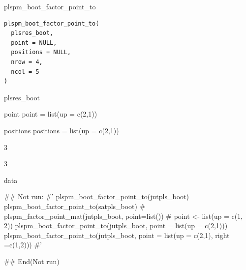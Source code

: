 \documentclass[a4paper]{book}
\begin{document}
%
\begin{Description}
plspm\_boot\_factor\_point\_to
\end{Description}
%
\begin{Usage}
\begin{verbatim}
plspm_boot_factor_point_to(
  plsres_boot,
  point = NULL,
  positions = NULL,
  nrow = 4,
  ncol = 5
)
\end{verbatim}
\end{Usage}
%
\begin{Arguments}
\begin{ldescription}
\item[\code{plsres\_boot}] plsres\_boot

\item[\code{point}] point point = list(up = c(2,1))

\item[\code{positions}] positions positions = list(up = c(2,1))

\item[\code{nrow}] 3

\item[\code{ncol}] 3
\end{ldescription}
\end{Arguments}
%
\begin{Value}
data
\end{Value}
%
\begin{Examples}
\begin{ExampleCode}

\#\# Not run: 
#'
plspm_boot_factor_point_to(jutpls_boot)
plspm_boot_factor_point_to(satpls_boot)
# plspm_factor_point_mat(jutpls_boot, point=list())
# point <- list(up = c(1, 2))
plspm_boot_factor_point_to(jutpls_boot, point = list(up = c(2,1)))
plspm_boot_factor_point_to(jutpls_boot, point = list(up = c(2,1), right =c(1,2)))
#'

## End(Not run)



\end{ExampleCode}
\end{Examples}
\end{document}

